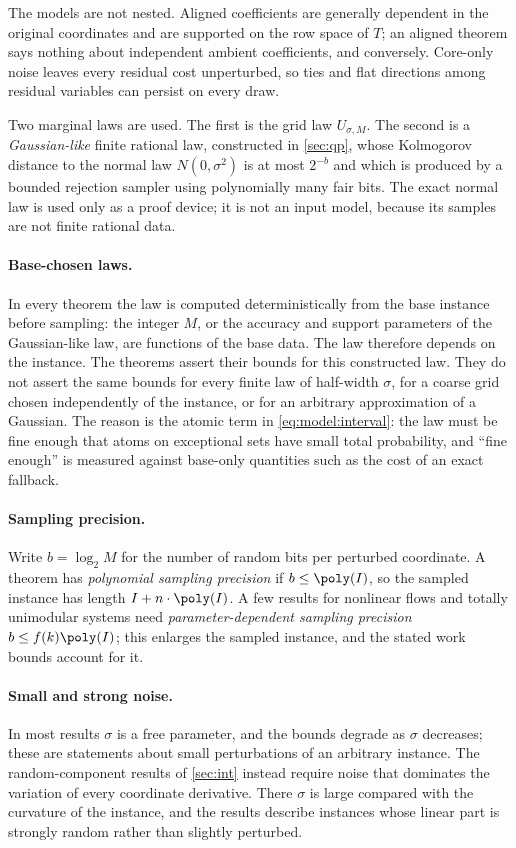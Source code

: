 The models are not nested. Aligned coefficients are generally dependent in
the original coordinates and are supported on the row space of $T$; an
aligned theorem says nothing about independent ambient coefficients, and
conversely. Core-only noise leaves every residual cost unperturbed, so ties
and flat directions among residual variables can persist on every draw.

Two marginal laws are used. The first is the grid law $U_{\sigma,M}$. The
second is a \emph{Gaussian-like} finite rational law, constructed in
\cref{sec:qp}, whose Kolmogorov distance to the normal law $N(0,\sigma^2)$ is
at most $2^{-b}$ and which is produced by a bounded rejection sampler using
polynomially many fair bits. The exact normal law is used only as a proof
device; it is not an input model, because its samples are not finite
rational data.

\paragraph{Base-chosen laws.}
In every theorem the law is computed deterministically from the base
instance before sampling: the integer $M$, or the accuracy and support
parameters of the Gaussian-like law, are functions of the base data. The law
therefore depends on the instance. The theorems assert their bounds for this
constructed law. They do not assert the same bounds for every finite law of
half-width $\sigma$, for a coarse grid chosen independently of the instance,
or for an arbitrary approximation of a Gaussian. The reason is the atomic
term in \eqref{eq:model:interval}: the law must be fine enough that atoms on
exceptional sets have small total probability, and ``fine enough'' is
measured against base-only quantities such as the cost of an exact fallback.

\paragraph{Sampling precision.}
Write $b=\log_2M$ for the number of random bits per perturbed coordinate. A
theorem has \emph{polynomial sampling precision} if $b\le\poly(I)$, so the
sampled instance has length $I+n\cdot\poly(I)$. A few results for nonlinear
flows and totally unimodular systems need \emph{parameter-dependent sampling
precision} $b\le f(k)\poly(I)$; this enlarges the sampled instance, and the
stated work bounds account for it.

\paragraph{Small and strong noise.}
In most results $\sigma$ is a free parameter, and the bounds degrade as
$\sigma$ decreases; these are statements about small perturbations of an
arbitrary instance. The random-component results of \cref{sec:int} instead
require noise that dominates the variation of every coordinate derivative.
There $\sigma$ is large compared with the curvature of the instance, and the
results describe instances whose linear part is strongly random rather than
slightly perturbed.

